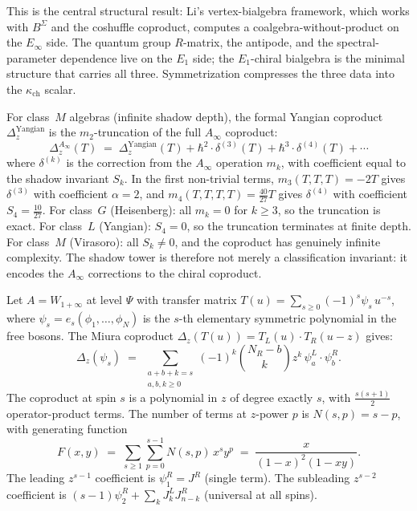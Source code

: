This is the central structural result: Li's vertex-bialgebra framework,
which works with $B^{\Sigma}$ and the coshuffle coproduct, computes a
coalgebra-without-product on the $E_\infty$ side. The quantum group
$R$-matrix, the antipode, and the spectral-parameter dependence live
on the $E_1$ side; the $E_1$-chiral bialgebra is the minimal structure
that carries all three. Symmetrization compresses the three data into
the $\kappa_{\mathrm{ch}}$ scalar.

\begin{remark}
\label{rem:ainfty-coproduct-shadow}
For class~$M$ algebras (infinite shadow depth), the formal Yangian coproduct $\Delta_z^{\mathrm{Yangian}}$ is the $m_2$-truncation of the full $A_\infty$ coproduct:
\[
 \Delta_z^{A_\infty}(T) \;=\; \Delta_z^{\mathrm{Yangian}}(T)
 + \hbar^2 \cdot \delta^{(3)}(T)
 + \hbar^3 \cdot \delta^{(4)}(T)
 + \cdots
\]
where $\delta^{(k)}$ is the correction from the $A_\infty$ operation $m_k$, with coefficient equal to the shadow invariant $S_k$. In the first non-trivial terms, \(m_3(T,T,T)=-2T\) gives \(\delta^{(3)}\) with coefficient \(\alpha=2\), and \(m_4(T,T,T,T)=\tfrac{40}{27}T\) gives \(\delta^{(4)}\) with coefficient \(S_4=\tfrac{10}{27}\). For class~$G$ (Heisenberg): all $m_k = 0$ for $k \geq 3$, so the truncation is exact. For class~$L$ (Yangian): $S_4 = 0$, so the truncation terminates at finite depth. For class~$M$ (Virasoro): all $S_k \neq 0$, and the coproduct has genuinely infinite complexity. The shadow tower is therefore not merely a classification invariant: it encodes the $A_\infty$ corrections to the chiral coproduct.
\end{remark}

\begin{proposition}
\label{prop:universal-coproduct}
Let $A = W_{1+\infty}$ at level $\Psi$ with transfer matrix $T(u) = \sum_{s \geq 0} (-1)^s \psi_s \, u^{-s}$, where $\psi_s = e_s(\phi_1, \ldots, \phi_N)$ is the $s$-th elementary symmetric polynomial in the free bosons. The Miura coproduct $\Delta_z(T(u)) = T_L(u) \cdot T_R(u - z)$ gives:
\[
 \Delta_z(\psi_s) \;=\; \sum_{\substack{a + b + k = s \\ a, b, k \geq 0}} (-1)^k \binom{N_R - b}{k} z^k \, \psi_a^L \cdot \psi_b^R.
\]
The coproduct at spin $s$ is a polynomial in $z$ of degree exactly $s$, with $\tfrac{s(s+1)}{2}$ operator-product terms. The number of terms at $z$-power $p$ is $N(s,p) = s - p$, with generating function
\[
 F(x,y) \;=\; \sum_{s \geq 1} \sum_{p=0}^{s-1} N(s,p) \, x^s y^p \;=\; \frac{x}{(1-x)^2(1-xy)}.
\]
The leading $z^{s-1}$ coefficient is $\psi_1^R = J^R$ (single term). The subleading $z^{s-2}$ coefficient is $(s-1)\psi_2^R + \sum_k J_k^L J_{n-k}^R$ (universal at all spins).
\end{proposition}

